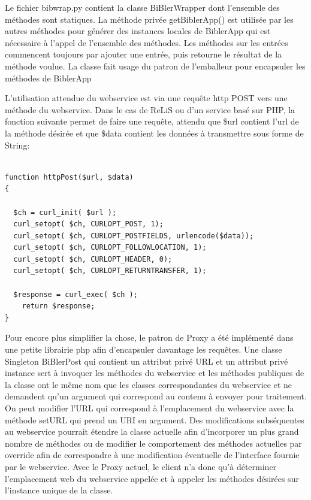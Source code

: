 \documentclass[12pt,titlepage]{article}
\begin{document}
Le fichier bibwrap.py contient la classe BiBlerWrapper dont l'ensemble des méthodes sont statiques. La méthode privée getBiblerApp() est utilisée par les autres méthodes pour générer des instances locales de BiblerApp qui est nécessaire à l'appel de l'ensemble des méthodes. Les méthodes sur les entrées commencent toujours par ajouter une entrée, puis retourne le résultat de la méthode voulue. La classe fait usage du patron de l'emballeur pour encapsuler les méthodes de BiblerApp \newline

L'utilisation attendue du webservice est via une requête http POST vers une méthode du webservice. Dans le cas de ReLiS ou d'un service basé sur PHP, la fonction suivante permet de faire une requête, attendu que \$url contient l'url de la méthode désirée et que \$data contient les données à transmettre sous forme de String: 
\begin{lstlisting}

function httpPost($url, $data)
{

  $ch = curl_init( $url );
  curl_setopt( $ch, CURLOPT_POST, 1);
  curl_setopt( $ch, CURLOPT_POSTFIELDS, urlencode($data));
  curl_setopt( $ch, CURLOPT_FOLLOWLOCATION, 1);
  curl_setopt( $ch, CURLOPT_HEADER, 0);
  curl_setopt( $ch, CURLOPT_RETURNTRANSFER, 1);

  $response = curl_exec( $ch );
    return $response;
}

\end{lstlisting}

Pour encore plus simplifier la chose, le patron de Proxy a été implémenté dans une petite librairie php afin d'encapsuler davantage les requêtes. Une classe Singleton BiBlerPost qui contient un attribut privé URL et un attribut privé instance sert à invoquer les méthodes du webservice et les méthodes publiques de la classe ont le même nom que les classes correspondantes du webservice et ne demandent qu'un argument qui correspond au contenu à envoyer pour traitement. On peut modifier l'URL qui correspond à l'emplacement du webservice avec la méthode setURL qui prend un URI en argument. Des modifications subséquentes au webservice pourrait étendre la classe actuelle afin d'incorporer un plus grand nombre de méthodes ou de modifier le comportement des méthodes actuelles par override afin de correspondre à une modification éventuelle de l'interface fournie par le webservice. Avec le Proxy actuel, le client n'a donc qu'à déterminer l'emplacement web du webservice appelée et à appeler les méthodes désirées sur l'instance unique de la classe. \newline
\end{document}
